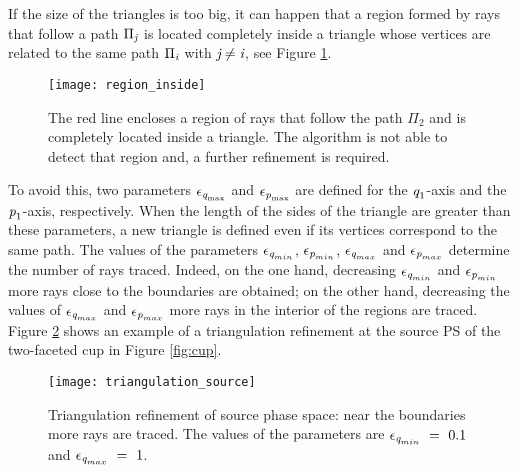 If the size of the triangles is too big, it can happen that a region formed by rays that follow a path $\Pi_{\textit{j}}$ is located completely inside a triangle whose vertices are related to the same path $\Pi_{\textit{i}}$ with $\textit{j} \neq  \textit{i}$, see Figure \ref{fig:region inside}.
\begin{figure}[h]
  \begin{center}
  \texttt{[image: region\_inside]}
  \end{center}
  \caption{The red line encloses a region of rays that follow the path $\Pi_2$ and is completely located inside a triangle.
  The algorithm is not able to detect that region and, a further refinement is required.}
   \label{fig:region inside}
  \end{figure}
To avoid this, two parameters $\epsilon_{\textit{q}_{\textrm{max}}}$ and $\epsilon_{\textit{p}_{\textrm{max}}}$ are defined for the $\textit{q}_1$-axis and the $\textit{p}_1$-axis, respectively.
When the length of the sides of the triangle are greater than these parameters, a new triangle is defined even if its vertices correspond to the same path.
The values of the parameters $\epsilon_{\textit{q}_{min}}$, $\epsilon_{\textit{p}_{min}}$, $\epsilon_{\textit{q}_{max}}$ and $\epsilon_{\textit{p}_{max}}$ determine the number of rays traced.
Indeed, on the one hand, decreasing $\epsilon_{\textit{q}_{min}}$ and $\epsilon_{\textit{p}_{min}}$ more rays close to the boundaries are obtained;
on the other hand, decreasing the values of $\epsilon_{\textit{q}_{max}}$ and $\epsilon_{\textit{p}_{max}}$ more rays in the interior of the regions are traced. %
\\ \indent  Figure \ref{fig:triangulation_refinement} shows an example of a triangulation refinement at the source PS of the two-faceted cup in Figure \ref{fig:cup}.
\begin{figure}[h]
  \begin{center}
  \texttt{[image: triangulation\_source]}
  \end{center}
  \caption{Triangulation refinement of source phase space:
  near the boundaries more rays are traced.
    The values of the parameters are $\epsilon_{\textit{q}_{min}}~=~ 0.1$ and $\epsilon_{\textit{q}_{max}}~=~1$.}
   \label{fig:triangulation_refinement}
  \end{figure}
